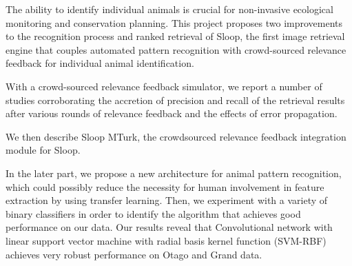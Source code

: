%
%
%



The ability to identify individual animals is crucial for non-invasive
ecological monitoring and conservation planning. This project proposes two
improvements to the recognition process and ranked retrieval of Sloop, the first
image retrieval engine that couples automated pattern recognition with
crowd-sourced relevance feedback for individual animal identification.

With a crowd-sourced relevance feedback simulator, we report a number of
studies corroborating the accretion of precision and recall of the retrieval
results after various rounds of relevance feedback and the effects of error
propagation.

We then describe Sloop MTurk, the crowdsourced relevance feedback integration
module for Sloop.

In the later part, we propose a new architecture for animal pattern
recognition, which could possibly reduce the necessity for human
involvement in feature extraction by using transfer learning. Then, we experiment
with a variety of binary classifiers in order to identify the algorithm that
achieves good performance on our data. Our results reveal that Convolutional
network with linear support vector machine with radial basis kernel function
(SVM-RBF) achieves very robust performance on Otago and Grand data.


